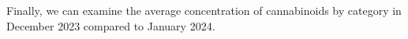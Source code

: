 \documentclass[../article.tex, 12pt]{subfiles}
\begin{document}
\newpage

Finally, we can examine the average concentration of cannabinoids by category in December 2023 compared to January 2024.

\noindent%
\begin{minipage}[t]{0.45\textwidth}

  {
    \tiny
    \vspace{1\baselineskip}
    
  }

\end{minipage}\hspace{0.05\textwidth}
%
\begin{minipage}[t]{0.45\textwidth}

  {
    \tiny
    \vspace{1\baselineskip}
    
  }

\end{minipage}






%

\end{document}
